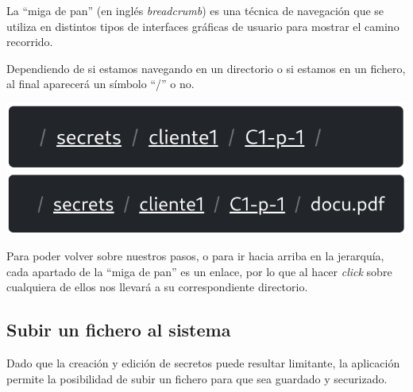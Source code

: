 \documentclass{\ClassPath/viu-tfm-template}
\begin{document}
La “miga de pan” (en inglés \textit{breadcrumb}) es una técnica de navegación que se utiliza en distintos tipos de interfaces gráficas de usuario para mostrar el camino recorrido.

Dependiendo de si estamos navegando en un directorio o si estamos en un fichero, al final aparecerá un símbolo “/” o no.

\begin{center}
    \includegraphics[width=0.6\linewidth]{img/breadcrumb1.png}
    \includegraphics[width=0.6\linewidth]{img/breadcrumb2.png}
\end{center}

Para poder volver sobre nuestros pasos, o para ir hacia arriba en la jerarquía, cada apartado de la “miga de pan” es un enlace, por lo que al hacer \textit{click} sobre cualquiera de ellos nos llevará a su correspondiente directorio.


\subsection{Subir un fichero al sistema}

Dado que la creación y edición de secretos puede resultar limitante, la aplicación permite la posibilidad de subir un fichero para que sea guardado y securizado.
\end{document}
